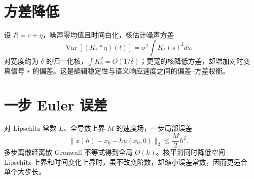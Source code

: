 \documentclass[11pt]{article}
\numberwithin{equation}{section}
\newcommand{\1}{\mathbf{1}}
\newcommand{\Var}{\operatorname{Var}}
\begin{document}
\section{方差降低}
设 $R=r+\eta$，噪声零均值且时间白化，核估计噪声方差
\begin{equation}
  \Var[(K_\delta*\eta)(t)]
  =\sigma^2\int K_\delta(s)^2ds.
\end{equation}
对宽度约为 $\delta$ 的归一化核，$\int K_\delta^2=O(1/\delta)$；更宽的核降低方差，却增加对时变真信号 $r$ 的偏差。这是编辑稳定性与语义响应速度之间的偏差--方差权衡。

\section{一步 Euler 误差}
对 Lipschitz 常数 $L$、全导数上界 $M$ 的速度场，一步局部误差
\begin{equation}
  \|x(h)-x_0-hu(x_0,0)\|_2\le\frac{M}{2}h^2.
\end{equation}
多步离散经离散 Gronwall 不等式得到全局 $O(h)$。核平滑同时降低空间 Lipschitz 上界和时间变化上界时，虽不改变阶数，却缩小误差常数，因而更适合单个大步长。
\end{document}
